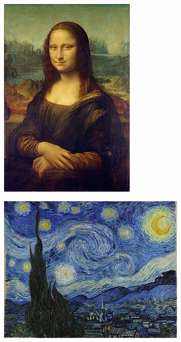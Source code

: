 \documentclass[a4paper,12pt]{article}
\begin{document}
\begin{figure}[H]
\centering
\begin{subfigure}{0.2\textwidth}
    \centering
    \includegraphics[width=\linewidth]{mona.jpg}
\end{subfigure}
\hfill
\begin{subfigure}{0.3\textwidth}
    \centering
    \includegraphics[width=\linewidth]{mona_van.jpg}
\end{subfigure}



\end{figure}
\end{document}
